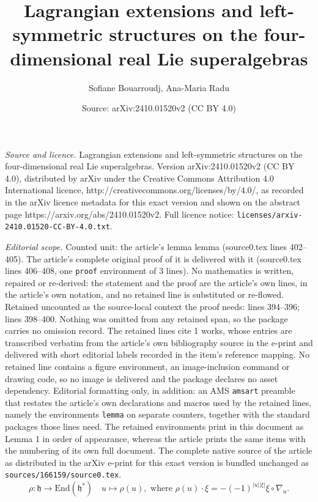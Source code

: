 \documentclass[10pt,a4paper]{amsart}
\title{Lagrangian extensions and left-symmetric structures on the four-dimensional real Lie superalgebras}
\author{Sofiane Bouarroudj, Ana-Maria Radu}
\date{Source: arXiv:2410.01520v2 (CC BY 4.0)}
\newcommand{\fh}{\mathfrak{h}}
\begin{document}
\maketitle

\noindent\emph{Source and licence.} Lagrangian extensions and left-symmetric structures on the four-dimensional real Lie superalgebras. Version arXiv:2410.01520v2 (CC BY 4.0), distributed by arXiv under the Creative Commons Attribution 4.0 International licence, http://creativecommons.org/licenses/by/4.0/, as recorded in the arXiv licence metadata for this exact version and shown on the abstract page https://arxiv.org/abs/2410.01520v2. Full licence notice: \texttt{licenses/arxiv-2410.01520-CC-BY-4.0.txt}.\par\smallskip

\noindent\textit{Editorial scope.} Counted unit: the article's lemma lemma (source0.tex lines 402--405). The article's complete original proof of it is delivered with it (source0.tex lines 406--408, one \texttt{proof} environment of 3 lines). No mathematics is written, repaired or re-derived: the statement and the proof are the article's own lines, in the article's own notation, and no retained line is substituted or re-flowed.  Retained uncounted as the source-local context the proof needs: lines 394--396; lines 398--400.  Nothing was omitted from any retained span, so the package carries no omission record.  The retained lines cite 1 works, whose entries are transcribed verbatim from the article's own bibliography source in the e-print and delivered with short editorial labels recorded in the item's reference mapping.  No retained line contains a figure environment, an image-inclusion command or drawing code, so no image is delivered and the package declares no asset dependency.  Editorial formatting only, in addition: an AMS \texttt{amsart} preamble that restates the article's own declarations and macros used by the retained lines, namely the environments \texttt{lemma} on separate counters, together with the standard packages those lines need.  The retained environments print in this document as Lemma 1 in order of appearance, whereas the article prints the same items with the numbering of its own full document.  The complete native source of the article as distributed in the arXiv e-print for this exact version is bundled unchanged as \texttt{sources/166159/source0.tex}.
\begin{equation}\label{eq5.1}
\rho: \fh \rightarrow \mathrm{End}(\mathfrak{h}^*) \quad u \mapsto \rho(u), \text{ where } \rho(u)\cdot \xi =- (-1)^{|u| |\xi|} \xi \circ \nabla_u.
\end{equation} 
\end{document}
